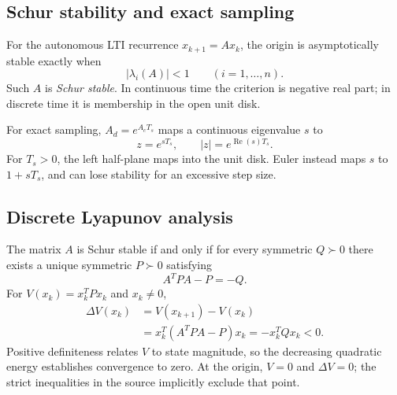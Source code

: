 \documentclass[11pt,a4paper]{article}
\numberwithin{equation}{section}
\numberwithin{figure}{section}
\numberwithin{table}{section}
\begin{document}
\subsection{Schur stability and exact sampling}
For the autonomous LTI recurrence $x_{k+1}=Ax_k$, the origin is asymptotically stable exactly when
\begin{equation}\label{eq:schur}|\lambda_i(A)|<1\qquad(i=1,\ldots,n).\end{equation}
Such $A$ is \emph{Schur stable}. In continuous time the criterion is negative real part; in discrete time it is membership in the open unit disk.

For exact sampling, $A_d=e^{A_cT_s}$ maps a continuous eigenvalue $s$ to
\begin{equation}z=e^{sT_s},\qquad |z|=e^{\operatorname{Re}(s)T_s}.\end{equation}
For $T_s>0$, the left half-plane maps into the unit disk. Euler instead maps $s$ to $1+sT_s$, and can lose stability for an excessive step size.

\subsection{Discrete Lyapunov analysis}
The matrix $A$ is Schur stable if and only if for every symmetric $Q\succ0$ there exists a unique symmetric $P\succ0$ satisfying
\begin{equation}\label{eq:lyapunov}A^TPA-P=-Q.\end{equation}
For $V(x_k)=x_k^TPx_k$ and $x_k\ne0$,
\begin{align}
\Delta V(x_k)&=V(x_{k+1})-V(x_k)\nonumber\\
&=x_k^T(A^TPA-P)x_k=-x_k^TQx_k<0.
\end{align}
Positive definiteness relates $V$ to state magnitude, so the decreasing quadratic energy establishes convergence to zero. At the origin, $V=0$ and $\Delta V=0$; the strict inequalities in the source implicitly exclude that point.
\end{document}

